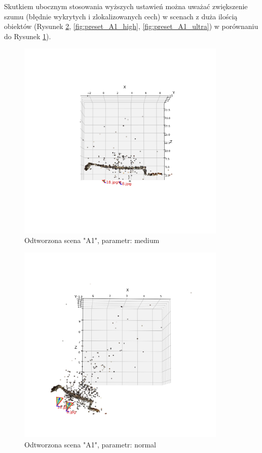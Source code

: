 Skutkiem ubocznym stosowania wyższych ustawień można uważać zwiększenie szumu (błędnie wykrytych i zlokalizowanych cech) w scenach z duża ilością obiektów (Rysunek \ref{fig:preset_A1_normal}, \ref{fig:preset_A1_high}, \ref{fig:preset_A1_ultra}) w porównaniu do Rysunek \ref{fig:preset_A1_medium}).

\begin{figure}[h]
   \centering
   \includegraphics[width=10cm]{preset_A1/medium.png}
   \caption{Odtworzona scena "A1", parametr: medium}
   \label {fig:preset_A1_medium}
\end{figure}
\begin{figure}[h]
   \centering
   \includegraphics[width=10cm]{preset_A1/normal.png}
   \caption{Odtworzona scena "A1", parametr: normal}
   \label {fig:preset_A1_normal}
\end{figure}

